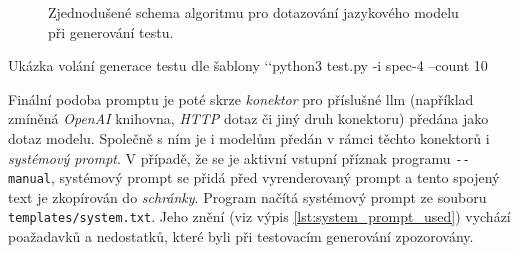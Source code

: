 \documentclass[czech, ma, kiv, he, iso690alph, pdf, viewonly]{fasthesis}
\begin{document}
        \begin{figure}
            \centering
            \caption{Zjednodušené schema algoritmu pro dotazování jazykového modelu při generování testu.}
            \label{fig:llm_query_algo}
        \end{figure}

        \begin{console}{Ukázka volání generace testu dle šablony \label{con:generation}}
`\uxprompt`python3 test.py -i spec-4 --count 10
        \end{console}

        Finální podoba promptu je poté skrze \textit{konektor} pro příslušné \Gls{llm} (například zmíněná \textit{OpenAI} knihovna, \textit{HTTP} dotaz či jiný druh konektoru) předána jako dotaz modelu. Společně s ním je i modelům předán v rámci těchto konektorů i \textit{systémový prompt}. V případě, že se je aktivní vstupní příznak programu \verb|--manual|, systémový prompt se přidá před vyrenderovaný prompt a tento spojený text je zkopírován do \textit{schránky}. Program načítá systémový prompt ze souboru \verb|templates/system.txt|. Jeho znění (viz výpis \ref{lst:system_prompt_used}) vychází poažadavků a nedostatků, které byli při testovacím generování zpozorovány.
\end{document}
